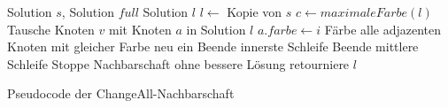 \begin{algorithm}
\begin{algorithmic}[1]
\Require Solution $s$, Solution $full$
\Ensure Solution $l$
\State $l \leftarrow$ Kopie von $s$
\State $c \leftarrow maximaleFarbe(l)$
\State Tausche Knoten $v$ mit Knoten $a$ in Solution $l$
\State $a.farbe \leftarrow i$
\State Färbe alle adjazenten Knoten mit gleicher Farbe neu ein
\State Beende innerste Schleife  
\EndIf
\EndFor
{}
\State Beende mittlere Schleife  
\EndIf
\EndFor
{}
\State Stoppe Nachbarschaft ohne bessere Lösung
\EndIf
\EndFor
\State retourniere $l$
\end{algorithmic}
\caption{Pseudocode der ChangeAll-Nachbarschaft}
\label{psy:ChangeAll}
\end{algorithm}
 
